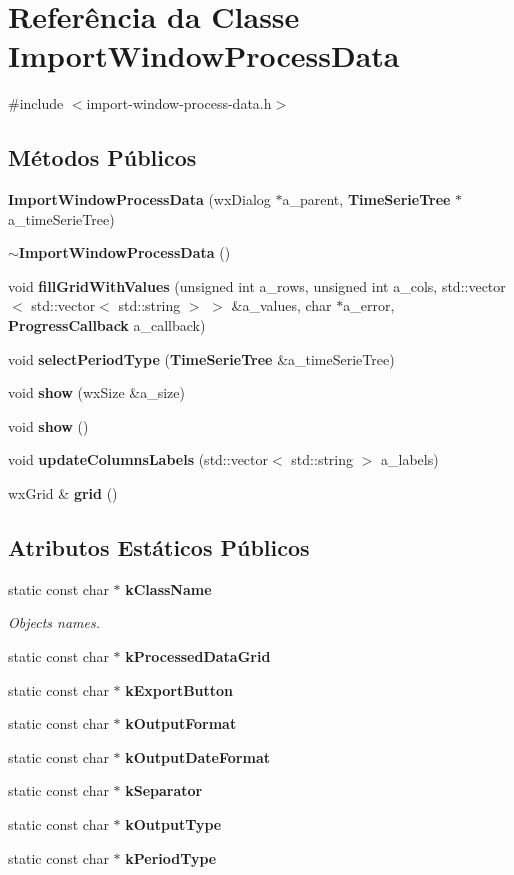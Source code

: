 \section{Referência da Classe Import\+Window\+Process\+Data}
\label{class_import_window_process_data}


{\ttfamily \#include $<$import-\/window-\/process-\/data.\+h$>$}

\subsection*{Métodos Públicos}
\begin{DoxyCompactItemize}
\item 
{\bf Import\+Window\+Process\+Data} (wx\+Dialog $\ast$a\+\_\+parent, {\bf Time\+Serie\+Tree} $\ast$a\+\_\+time\+Serie\+Tree)
\item 
{\bf $\sim$\+Import\+Window\+Process\+Data} ()
\item 
void {\bf fill\+Grid\+With\+Values} (unsigned int a\+\_\+rows, unsigned int a\+\_\+cols, std\+::vector$<$ std\+::vector$<$ std\+::string $>$ $>$ \&a\+\_\+values, char $\ast$a\+\_\+error, {\bf Progress\+Callback} a\+\_\+callback)
\item 
void {\bf select\+Period\+Type} ({\bf Time\+Serie\+Tree} \&a\+\_\+time\+Serie\+Tree)
\item 
void {\bf show} (wx\+Size \&a\+\_\+size)
\item 
void {\bf show} ()
\item 
void {\bf update\+Columns\+Labels} (std\+::vector$<$ std\+::string $>$ a\+\_\+labels)
\item 
wx\+Grid \& {\bf grid} ()
\end{DoxyCompactItemize}
\subsection*{Atributos Estáticos Públicos}
\begin{DoxyCompactItemize}
\item 
static const char $\ast$ {\bf k\+Class\+Name}
\begin{DoxyCompactList}\small\item\em Object\textquotesingle{}s names. \end{DoxyCompactList}\item 
static const char $\ast$ {\bf k\+Processed\+Data\+Grid}
\item 
static const char $\ast$ {\bf k\+Export\+Button}
\item 
static const char $\ast$ {\bf k\+Output\+Format}
\item 
static const char $\ast$ {\bf k\+Output\+Date\+Format}
\item 
static const char $\ast$ {\bf k\+Separator}
\item 
static const char $\ast$ {\bf k\+Output\+Type}
\item 
static const char $\ast$ {\bf k\+Period\+Type}
\end{DoxyCompactItemize}
